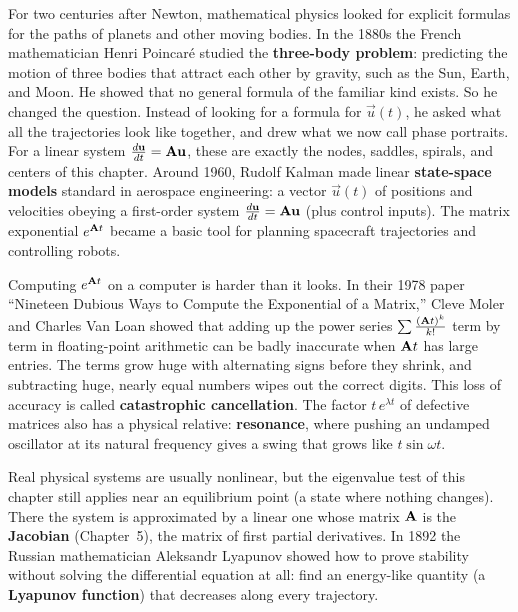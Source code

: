 \begin{historybox}
For two centuries after Newton, mathematical physics looked for explicit formulas for the paths of planets and other moving bodies. In the 1880s the French mathematician Henri Poincar\'e studied the \textbf{three-body problem}: predicting the motion of three bodies that attract each other by gravity, such as the Sun, Earth, and Moon. He showed that no general formula of the familiar kind exists. So he changed the question. Instead of looking for a formula for $\vec{u}(t)$, he asked what all the trajectories look like together, and drew what we now call phase portraits. For a linear system $\frac{d\mathbf{u}}{dt} = \mathbf{A}\mathbf{u}$, these are exactly the nodes, saddles, spirals, and centers of this chapter. Around 1960, Rudolf Kalman made linear \textbf{state-space models} standard in aerospace engineering: a vector $\vec{u}(t)$ of positions and velocities obeying a first-order system $\frac{d\mathbf{u}}{dt} = \mathbf{A}\mathbf{u}$ (plus control inputs). The matrix exponential $e^{\mathbf{A}t}$ became a basic tool for planning spacecraft trajectories and controlling robots.

Computing $e^{\mathbf{A}t}$ on a computer is harder than it looks. In their 1978 paper ``Nineteen Dubious Ways to Compute the Exponential of a Matrix,'' Cleve Moler and Charles Van Loan showed that adding up the power series $\sum \frac{(\mathbf{A}t)^k}{k!}$ term by term in floating-point arithmetic can be badly inaccurate when $\mathbf{A}t$ has large entries. The terms grow huge with alternating signs before they shrink, and subtracting huge, nearly equal numbers wipes out the correct digits. This loss of accuracy is called \textbf{catastrophic cancellation}. The factor $t\,e^{\lambda t}$ of defective matrices also has a physical relative: \textbf{resonance}, where pushing an undamped oscillator at its natural frequency gives a swing that grows like $t\sin\omega t$.

Real physical systems are usually nonlinear, but the eigenvalue test of this chapter still applies near an equilibrium point (a state where nothing changes). There the system is approximated by a linear one whose matrix $\mathbf{A}$ is the \textbf{Jacobian} (Chapter~5), the matrix of first partial derivatives. In 1892 the Russian mathematician Aleksandr Lyapunov showed how to prove stability without solving the differential equation at all: find an energy-like quantity (a \textbf{Lyapunov function}) that decreases along every trajectory.


\end{historybox}

